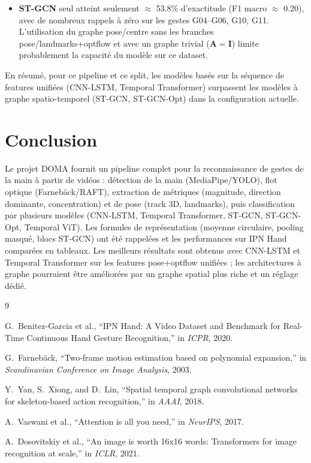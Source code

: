 \documentclass[11pt,a4paper]{article}
\begin{document}
\begin{itemize}
  \item \textbf{ST-GCN} seul atteint seulement $\approx$ 53.8\% d’exactitude (F1 macro $\approx$ 0.20), avec de nombreux rappels à zéro sur les gestes G04--G06, G10, G11. L’utilisation du graphe pose/centre sans les branches pose/landmarks+optflow et avec un graphe trivial ($\mathbf{A}=\mathbf{I}$) limite probablement la capacité du modèle sur ce dataset.
\end{itemize}

En résumé, pour ce pipeline et ce split, les modèles basés sur la séquence de features unifiées (CNN-LSTM, Temporal Transformer) surpassent les modèles à graphe spatio-temporel (ST-GCN, ST-GCN-Opt) dans la configuration actuelle.

\section{Conclusion}
\label{sec:conclusion}

Le projet DOMA fournit un pipeline complet pour la reconnaissance de gestes de la main à partir de vidéos : détection de la main (MediaPipe/YOLO), flot optique (Farnebäck/RAFT), extraction de métriques (magnitude, direction dominante, concentration) et de pose (track 3D, landmarks), puis classification par plusieurs modèles (CNN-LSTM, Temporal Transformer, ST-GCN, ST-GCN-Opt, Temporal ViT). Les formules de représentation (moyenne circulaire, pooling masqué, blocs ST-GCN) ont été rappelées et les performances sur IPN Hand comparées en tableaux. Les meilleurs résultats sont obtenus avec CNN-LSTM et Temporal Transformer sur les features pose+optflow unifiées ; les architectures à graphe pourraient être améliorées par un graphe spatial plus riche et un réglage dédié.

\begin{thebibliography}{9}

G.~Benitez-Garcia et al.,
``IPN Hand: A Video Dataset and Benchmark for Real-Time Continuous Hand Gesture Recognition,''
in \textit{ICPR}, 2020.

G.~Farnebäck,
``Two-frame motion estimation based on polynomial expansion,''
in \textit{Scandinavian Conference on Image Analysis}, 2003.

Y.~Yan, S.~Xiong, and D.~Lin,
``Spatial temporal graph convolutional networks for skeleton-based action recognition,''
in \textit{AAAI}, 2018.

A.~Vaswani et al.,
``Attention is all you need,''
in \textit{NeurIPS}, 2017.

A.~Dosovitskiy et al.,
``An image is worth 16x16 words: Transformers for image recognition at scale,''
in \textit{ICLR}, 2021.

\end{thebibliography}
\end{document}
